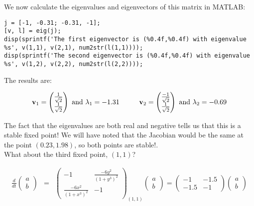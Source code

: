 \documentclass{article}
\begin{document}
We now calculate the eigenvalues and eigenvectors of this matrix in MATLAB:
\begin{lstlisting}
j = [-1, -0.31; -0.31, -1];
[v, l] = eig(j);
disp(sprintf('The first eigenvector is (%0.4f,%0.4f) with eigenvalue %s', v(1,1), v(2,1), num2str(l(1,1))));
disp(sprintf('The second eigenvector is (%0.4f,%0.4f) with eigenvalue %s', v(1,2), v(2,2), num2str(l(2,2))));
\end{lstlisting}

The results are:

\[ \mathbf{v}_1 = \begin{pmatrix} \frac{1}{\sqrt{2}}\\ \frac{1}{\sqrt{2}} \end{pmatrix} \textrm{ and } \lambda_1 = -1.31 \hspace{1 cm} \mathbf{v}_2 = \begin{pmatrix} \frac{-1}{\sqrt{2}}\\ \frac{1}{\sqrt{2}} \end{pmatrix} \textrm{ and } \lambda_2 = -0.69 \]

The fact that the eigenvalues are both real and negative tells us that this is a stable fixed point! We will have noted that the Jacobian would be the same at the point $(0.23, 1.98)$, so both points are stable!.\\

What about the third fixed point, $(1,1)$?

\begin{eqnarray*}
\frac{d}{dt} \begin{pmatrix} a \\ b \end{pmatrix} & = & \begin{pmatrix} -1 & \frac{- 6 y^{2}}{(1+y^{3})^2} \\ \frac{- 6 x^{2}}{(1+x^{3})^2} & -1  \end{pmatrix}_{(1,1)} \begin{pmatrix} a \\ b \end{pmatrix} = \begin{pmatrix} -1 & -1.5 \\ -1.5 & -1 \end{pmatrix} \begin{pmatrix} a \\ b \end{pmatrix}\\
\end{eqnarray*}
\end{document}
